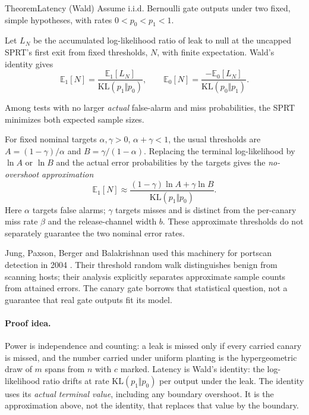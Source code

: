 \documentclass[11pt,a4paper]{article}
\theoremstyle{definition}
\begin{document}
\begin{pdclaim}{Theorem}{Latency (Wald)}
\setlength{\parskip}{4pt plus 1pt}
\label{thm:sealed-latency}%
%
Assume i.i.d. Bernoulli gate outputs under two fixed, simple hypotheses,
with rates $0<p_0<p_1<1$.

Let $L_N$ be the accumulated log-likelihood ratio
of leak to null at the uncapped SPRT's first exit from fixed thresholds,
$N$, with finite expectation.
Wald's identity gives
\[
\mathbb{E}_1[N]=\frac{\mathbb{E}_1[L_N]}{\mathrm{KL}(p_1\Vert p_0)},
\qquad
\mathbb{E}_0[N]=\frac{-\mathbb{E}_0[L_N]}{\mathrm{KL}(p_0\Vert p_1)}.
\]

Among tests with no larger \emph{actual} false-alarm and miss probabilities,
the SPRT minimizes both expected sample sizes.
\end{pdclaim}

For fixed nominal targets $\alpha,\gamma>0$, $\alpha+\gamma<1$, the usual
thresholds are $A=(1-\gamma)/\alpha$ and $B=\gamma/(1-\alpha)$.
Replacing the terminal log-likelihood by $\ln A$ or $\ln B$ and the actual
error probabilities by the targets gives the \emph{no-overshoot approximation}
\[
\mathbb{E}_1[N]\approx
\frac{(1-\gamma)\ln A+\gamma\ln B}{\mathrm{KL}(p_1\Vert p_0)}.
\]
Here $\alpha$ targets false alarms; $\gamma$ targets misses and is distinct
from the per-canary miss rate $\beta$ and the
release-channel width $b$. These approximate thresholds do not separately
guarantee the two nominal error rates.

Jung, Paxson, Berger and Balakrishnan used this machinery for portscan
detection in 2004 . Their threshold random walk distinguishes
benign from scanning hosts; their analysis explicitly separates approximate
sample counts from attained errors. The canary gate borrows that statistical
question, not a guarantee that real gate outputs fit its model.

\paragraph{Proof idea.}
Power%
\space is independence and counting: a leak is missed only if every carried
canary is missed, and the number carried under uniform planting is the
hypergeometric draw of $m$ spans from $n$ with $c$ marked. Latency is Wald's
identity: the log-likelihood ratio drifts at rate $\mathrm{KL}(p_1\Vert p_0)$
per output under the leak. The identity uses its \emph{actual terminal value},
including any boundary overshoot. It is the approximation above, not the
identity, that replaces that value by the boundary.
\end{document}

